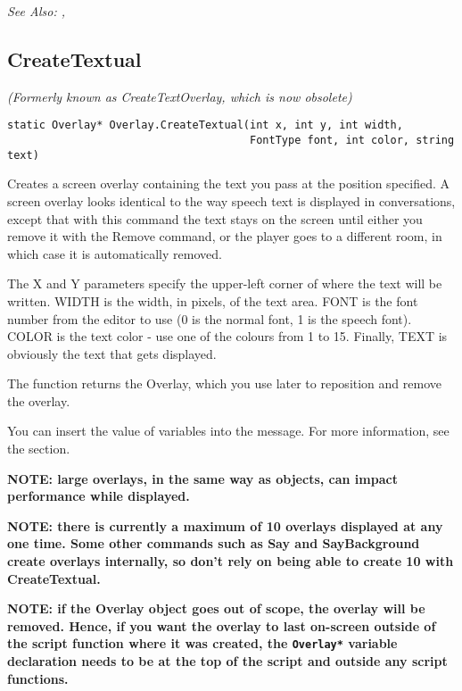 \it{See Also:} ,


\subsection{CreateTextual}\label{Overlay.CreateTextual}%

\it{(Formerly known as CreateTextOverlay, which is now obsolete)}

\begin{verbatim}
static Overlay* Overlay.CreateTextual(int x, int y, int width,
                                      FontType font, int color, string text)
\end{verbatim}
Creates a screen overlay containing the text you pass at the position
specified. A screen overlay looks identical to the way speech text is
displayed in conversations, except that with this command the text stays
on the screen until either you remove it with the Remove command, or the player
goes to a different room, in which case it is automatically removed.

The X and Y parameters specify the upper-left corner of where the text
will be written. WIDTH is the width, in pixels, of the text area. FONT is
the font number from the editor to use (0 is the normal font, 1 is the speech
font). COLOR is the text color - use one of the colours from 1 to 15.
Finally, TEXT is obviously the text that gets displayed.

The function returns the Overlay, which you use later to reposition
and remove the overlay.

You can insert the value of variables into the message. For more information,
see the  section.

\bf{NOTE:} large overlays, in the same way as objects, can impact performance
while displayed.

\bf{NOTE:} there is currently a maximum of 10 overlays displayed at any one time. Some other
commands such as Say and SayBackground create overlays internally,
so don't rely on being able to create 10 with CreateTextual.

\bf{NOTE:} if the Overlay object goes out of scope, the overlay will be removed. Hence,
if you want the overlay to last on-screen outside of the script function where it
was created, the \verb$Overlay*$ variable declaration needs to be at the top of
the script and outside any script functions.

